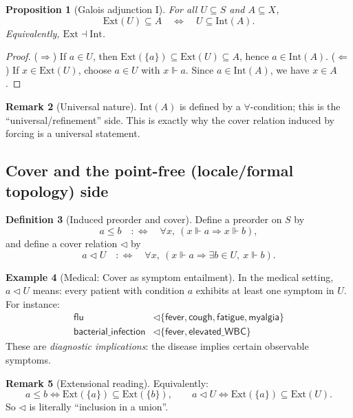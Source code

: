 \documentclass[11pt]{article}
\theoremstyle{definition}
\newtheorem{definition}{Definition}[section]
\newtheorem{remark}[definition]{Remark}
\newtheorem{example}[definition]{Example}
\theoremstyle{plain}
\newtheorem{proposition}[definition]{Proposition}
\newcommand{\Ext}{\mathrm{Ext}}
\newcommand{\Intt}{\mathrm{Int}}
\newcommand{\forces}{\Vdash}
\newcommand{\covers}{\triangleleft}
\begin{document}
\begin{proposition}[Galois adjunction I]
For all $U\subseteq S$ and $A\subseteq X$,
\[
\Ext(U)\subseteq A \quad\Longleftrightarrow\quad U\subseteq \Intt(A).
\]
Equivalently, $\Ext\dashv \Intt$.
\end{proposition}

\begin{proof}
($\Rightarrow$) If $a\in U$, then $\Ext(\{a\})\subseteq \Ext(U)\subseteq A$, hence $a\in \Intt(A)$.
($\Leftarrow$) If $x\in \Ext(U)$, choose $a\in U$ with $x\forces a$. Since $a\in\Intt(A)$, we have $x\in A$.
\end{proof}

\begin{remark}[Universal nature]
$\Intt(A)$ is defined by a $\forall$-condition; this is the ``universal/refinement'' side.
This is exactly why the cover relation induced by forcing is a universal statement.
\end{remark}

\subsection{Cover and the point-free (locale/formal topology) side}

\begin{definition}[Induced preorder and cover]
Define a preorder on $S$ by
\[
a\le b \quad:\Longleftrightarrow\quad \forall x,\ (x\forces a\Rightarrow x\forces b),
\]
and define a cover relation $\covers$ by
\[
a\covers U \quad:\Longleftrightarrow\quad \forall x,\ (x\forces a \Rightarrow \exists b\in U,\ x\forces b).
\]
\end{definition}

\begin{example}[Medical: Cover as symptom entailment]\label{ex:medical-cover}
In the medical setting, $a \covers U$ means: every patient with condition $a$ exhibits at least one symptom in $U$.
For instance:
\begin{align*}
\mathsf{flu} &\covers \{\mathsf{fever}, \mathsf{cough}, \mathsf{fatigue}, \mathsf{myalgia}\} \\
\mathsf{bacterial\_infection} &\covers \{\mathsf{fever}, \mathsf{elevated\_WBC}\}
\end{align*}
These are \emph{diagnostic implications}: the disease implies certain observable symptoms.
\end{example}

\begin{remark}[Extensional reading]
Equivalently:
\[
a\le b \iff \Ext(\{a\})\subseteq \Ext(\{b\}),\qquad
a\covers U \iff \Ext(\{a\})\subseteq \Ext(U).
\]
So $\covers$ is literally ``inclusion in a union''.
\end{remark}
\end{document}
